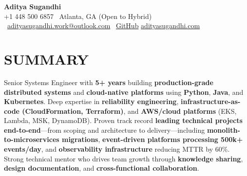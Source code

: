 \documentclass[letterpaper,10pt]{article}
\begin{document}
\begin{center}
{\huge\textbf{Aditya Sugandhi}} \\
+1 448 500 6857 \textbar\ \textcolor{metablue}{Atlanta, GA (Open to Hybrid)} \textbar\
\href{mailto:adityasugandhi.work@outlook.com}{adityasugandhi.work@outlook.com} \textbar\
\href{https://github.com/adityasugandhi}{GitHub}
\textbar \href{https://adityasugandhi.com}{adityasugandhi.com}
\end{center}
\vspace{-12pt}

\section{\textcolor{metablue}{SUMMARY}}
\small
\vspace{-6pt}
Senior Systems Engineer with \textbf{5+ years} building \textbf{production-grade distributed systems} and \textbf{cloud-native platforms} using \textbf{Python}, \textbf{Java}, and \textbf{Kubernetes}. Deep expertise in \textbf{reliability engineering}, \textbf{infrastructure-as-code (CloudFormation, Terraform)}, and \textbf{AWS/cloud platforms} (EKS, Lambda, MSK, DynamoDB). Proven track record \textbf{leading technical projects end-to-end}—from scoping and architecture to delivery—including \textbf{monolith-to-microservices migrations}, \textbf{event-driven platforms processing 500k+ events/day}, and \textbf{observability infrastructure} reducing MTTR by 60\%. Strong technical mentor who drives team growth through \textbf{knowledge sharing}, \textbf{design documentation}, and \textbf{cross-functional collaboration}.

\vspace{-9pt}

\end{document}
